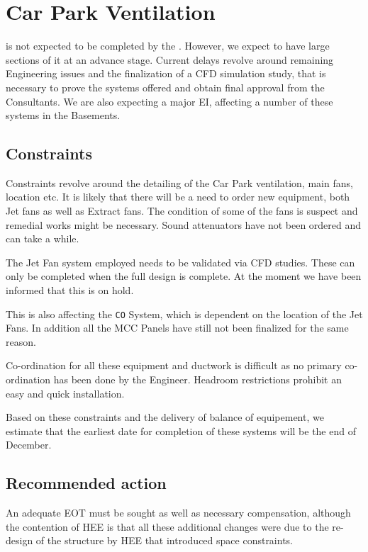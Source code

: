 \chapter{Car Park Ventilation}

 is not expected to be completed by the \deadline. However, we expect to have large sections of it at an advance stage. Current delays revolve around remaining Engineering issues and the finalization of a CFD simulation study, that is necessary to prove the systems offered and obtain final approval from the Consultants. We are also expecting a major EI, affecting a number of these systems in the Basements. 


\section{Constraints}
Constraints revolve around the detailing of the Car Park ventilation,  main fans, location etc. It is likely that there will be a need to order new equipment, both Jet fans as well as Extract fans. The condition of some of the fans is suspect and remedial works might be necessary. Sound attenuators have not been ordered and can take a while.

The Jet Fan system employed needs to be validated via CFD studies. These can only be completed when the full design is complete. At the moment we have been informed that this is on hold.

This is also affecting the \texttt{CO} System, which is dependent on the location of the Jet Fans. In addition all the MCC Panels have still not been finalized for the same reason.

Co-ordination for all these equipment and ductwork is difficult as no primary co-ordination has been done by the Engineer. Headroom restrictions prohibit an easy and quick installation.

Based on these constraints and the delivery of balance of equipement, we estimate that the earliest date for completion of these systems will be the end of December. 

\section{Recommended action}

An adequate EOT must be sought as well as necessary compensation, although the contention of HEE is that all these additional changes were due to the re-design of the structure by HEE that introduced space constraints.